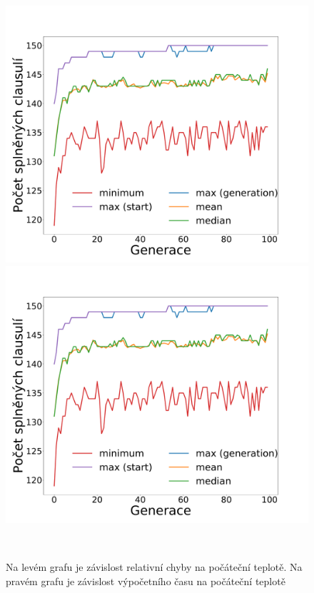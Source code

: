 \documentclass[11pt]{article}
\begin{document}
 


\begin{figure}
	\centering
    \begin{minipage}[c]{0.42\textwidth}
        \centering\includegraphics[width=\textwidth]{img/1c.pdf} 
    \end{minipage}
    \begin{minipage}[c]{0.42\textwidth}
        \centering \includegraphics[width=\textwidth]{img/1c.pdf} 
    \end{minipage}
    \\
   \caption{Na levém grafu je závislost relativní chyby na počáteční teplotě. Na pravém grafu je závislost výpočetního času na počáteční teplotě}\label{fig:GZNT}
\end{figure} 
\end{document}
